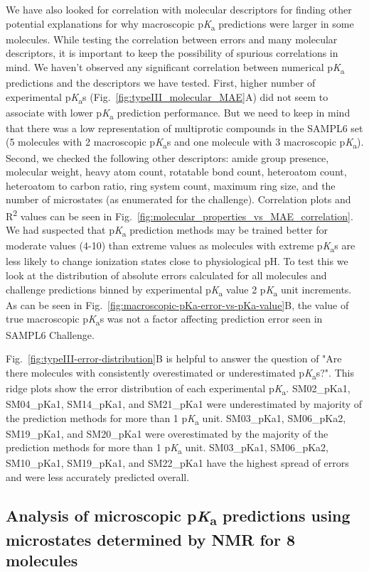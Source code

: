 \documentclass[9pt,lineno,final]{elife}
\newcommand{\pKa}{p\textit{K}\textsubscript{a}}
\begin{document}
We have also looked for correlation with molecular descriptors for finding other potential explanations for why macroscopic \pKa{} predictions were larger in some molecules. 
While testing the correlation between errors and many molecular descriptors, it is important to keep the possibility of spurious correlations in mind. 
We haven't observed any significant correlation between numerical \pKa{} predictions and the descriptors we have tested. 
First, higher number of experimental \pKa{}s (Fig.~\ref{fig:typeIII_molecular_MAE}A) did not seem to associate with lower \pKa{} prediction performance. 
But we need to keep in mind that there was a low representation of multiprotic compounds in the SAMPL6 set (5 molecules with 2 macroscopic \pKa{}s and one molecule with 3 macroscopic \pKa{}).
Second, we checked the following other descriptors: amide group presence, molecular weight, heavy atom count, rotatable bond count, heteroatom count, heteroatom to carbon ratio, ring system count, maximum ring size, and the number of microstates (as enumerated for the challenge). 
Correlation plots and R\textsuperscript{2} values can be seen in Fig.~\ref{fig:molecular_properties_vs_MAE_correlation}. 
We had suspected that \pKa{} prediction methods may be trained better for moderate values (4-10) than extreme values as molecules with extreme \pKa{}s are less likely to change ionization states close to physiological pH. To test this we look at the distribution of absolute errors calculated for all molecules and challenge predictions binned by experimental \pKa{} value 2 \pKa{} unit increments. 
As can be seen in Fig.~\ref{fig:macroscopic-pKa-error-vs-pKa-value}B, the value of true macroscopic \pKa{}s was not a factor affecting prediction error seen in SAMPL6 Challenge.

Fig.~\ref{fig:typeIII-error-distribution}B is helpful to answer the question of "Are there molecules with consistently overestimated or underestimated \pKa{}s?". This ridge plots show the error distribution of each experimental \pKa{}. SM02\_pKa1, SM04\_pKa1, SM14\_pKa1, and SM21\_pKa1 were underestimated by majority of the prediction methods for more than 1 \pKa{} unit. 
SM03\_pKa1, SM06\_pKa2, SM19\_pKa1, and SM20\_pKa1 were overestimated by the majority of the prediction methods for more than 1 \pKa{} unit.
SM03\_pKa1, SM06\_pKa2, SM10\_pKa1, SM19\_pKa1, and SM22\_pKa1 have the highest spread of errors and were less accurately predicted overall. 



\subsection{Analysis of microscopic \pKa{} predictions using microstates determined by NMR for 8 molecules}
\end{document}
